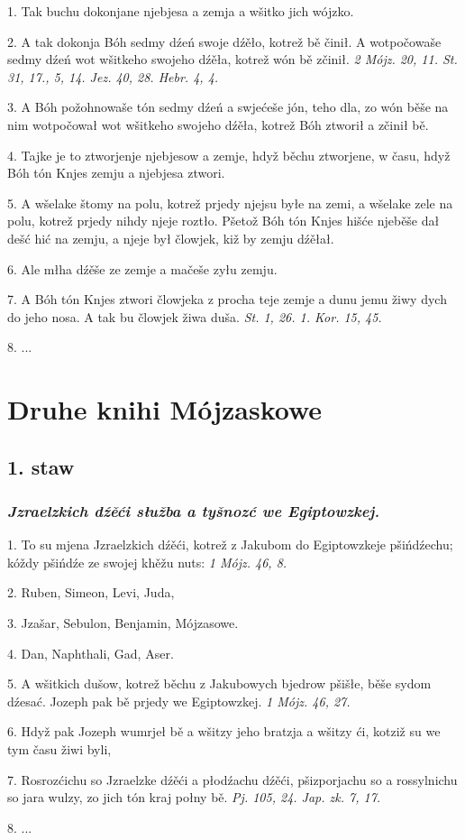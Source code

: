 \documentclass[twocolumn,b5paper]{book}
\begin{document}
1. Tak buchu dokonjane njebjesa a zemja a wšitko jich wójzko. 

2. A tak dokonja Bóh sedmy dźeń swoje dźěło, kotrež bě činił. A wotpočowaše sedmy dźeń wot wšitkeho swojeho dźěła, kotrež wón bě zčinił. \hfill {\footnotesize \textit{2 Mójz. 20, 11. St. 31, 17., 5, 14. Jez. 40, 28. Hebr. 4, 4.}} 

3. A Bóh požohnowaše tón sedmy dźeń a swjećeše jón, teho dla, zo wón běše na nim wotpočował wot wšitkeho swojeho dźěła, kotrež Bóh ztworił a zčinił bě. 

4. Tajke je to ztworjenje njebjesow a zemje, hdyž běchu ztworjene, w času, hdyž Bóh tón Knjes zemju a njebjesa ztwori. 

5. A wšelake štomy na polu, kotrež prjedy njejsu byłe na zemi, a wšelake zele na polu, kotrež prjedy nihdy njeje roztło. Pšetož Bóh tón Knjes hišće njeběše dał dešć hić na zemju, a njeje był člowjek, kiž by zemju dźěłał. 

6. Ale młha dźěše ze zemje a mačeše zyłu zemju. 

7. A Bóh tón Knjes ztwori člowjeka z procha teje zemje a dunu jemu žiwy dych do jeho nosa. A tak bu člowjek žiwa duša. \hfill {\footnotesize \textit{St. 1, 26. 1. Kor. 15, 45.}}

8. ...

\chapter*{Druhe knihi Mójzaskowe}

\section*{1. staw}

\subsection*{\textit{Jzraelzkich dźěći słužba a tyšnozć we Egiptowzkej.}} 

1. To su mjena Jzraelzkich dźěći, kotrež z Jakubom do Egiptowzkeje pšińdźechu; kóždy pšińdźe ze swojej khěžu nuts: \hfill {\footnotesize \textit{1 Mójz. 46, 8.}}

2. Ruben, Simeon, Levi, Juda, 

3. Jzašar, Sebulon, Benjamin, Mójzasowe. 

4. Dan, Naphthali, Gad, Aser. 

5. A wšitkich dušow, kotrež běchu z Jakubowych bjedrow pšišłe, běše sydom dźesać. Jozeph pak bě prjedy we Egiptowzkej. \hfill {\footnotesize \textit{1 Mójz. 46, 27.}}

6. Hdyž pak Jozeph wumrjeł bě a wšitzy jeho bratzja a wšitzy ći, kotziž su we tym času žiwi byli,

7. Rosrozćichu so Jzraelzke dźěći a płodźachu dźěći, pšizporjachu so a rossylnichu so jara wulzy, zo jich tón kraj połny bě. \hfill {\footnotesize \textit{Pj. 105, 24. Jap. zk. 7, 17.}}

8. ...
\end{document}
